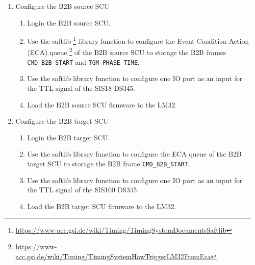 \begin{enumerate}
  \item Configure the B2B source SCU
  \begin{enumerate}
    \item Login the B2B source SCU.
    \item Use the saftlib \footnote{\url{https://www-acc.gsi.de/wiki/Timing/TimingSystemDocumentsSaftlib}} library function to configure the Event-Condition-Action (ECA) queue \footnote{\url{https://www-acc.gsi.de/wiki/Timing/TimingSystemHowTriggerLM32FromEca}} of the B2B source SCU to storage the B2B frames \verb|CMD_B2B_START| and \verb|TGM_PHASE_TIME|.
	\item Use the saftlib library function to configure one IO port as an input for the TTL signal of the SIS18 DS345.
	\item Load the B2B source SCU firmware to the LM32.
	 \end{enumerate}
  \item Configure the B2B target SCU
    \begin{enumerate}
    \item Login the B2B target SCU.
    \item Use the saftlib library function to configure the ECA queue of the B2B target SCU to storage the B2B frame \verb|CMD_B2B_START|.
	\item Use the saftlib library function to configure one IO port as an input for the TTL signal of the SIS100 DS345.
	\item Load the B2B target SCU firmware to the LM32.

\end{enumerate}
\end{enumerate}
